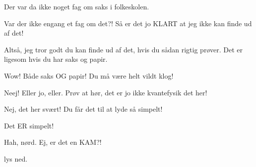 \documentclass[a4paper,11pt]{article}
\begin{document}
\begin{sketch}
 Der var da ikke noget fag om saks i folkeskolen.

 Var der ikke engang et fag om det?! Så er det jo KLART at jeg ikke kan
finde ud af det!

 Altså, jeg tror godt du kan finde ud af det, hvis du sådan rigtig
prøver. Det er ligesom hvis du har saks og papir.

 Wow! Både saks OG papir! Du må være helt vildt klog!

 Neej! Eller jo, eller. Prøv at hør, det er jo ikke kvantefysik det her!

 Nej, det her svært! Du får det til at lyde så simpelt!

 Det ER simpelt!

 Hah, nørd.  Ej, er det en KAM?!

\scene lys ned.

\end{sketch}
\end{document}
